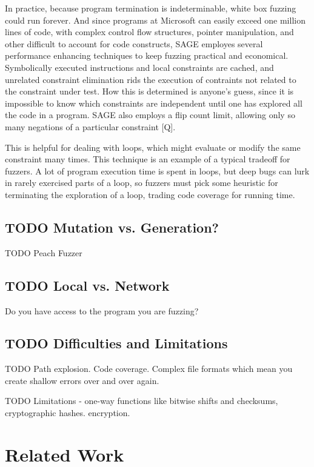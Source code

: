 \documentclass[11pt,expanded,copyright]{fsuthesis}
\begin{document}
In practice, because program termination is indeterminable, white box fuzzing could run forever. And since programs at Microsoft can easily exceed one million lines of code, with complex control flow structures, pointer manipulation, and other difficult to account for code constructs, SAGE employes several performance enhancing techniques to keep fuzzing practical and economical. Symbolically executed instructions and local constraints are cached, and unrelated constraint elimination rids the execution of contraints not related to the constraint under test. How this is determined is anyone's guess, since it is impossible to know which constraints are independent until one has explored all the code in a program. SAGE also employs a flip count limit, allowing only so many negations of a particular constraint [Q]. 

This is helpful for dealing with loops, which might evaluate or modify the same constraint many times. This technique is an example of a typical tradeoff for fuzzers. A lot of program execution time is spent in loops, but deep bugs can lurk in rarely exercised parts of a loop, so fuzzers must pick some heuristic for terminating the exploration of a loop, trading code coverage for running time.


\section{TODO Mutation vs. Generation?}

TODO Peach Fuzzer

\section{TODO Local vs. Network}

Do you have access to the program you are fuzzing?

\section{TODO Difficulties and Limitations}

TODO Path explosion. Code coverage. Complex file formats which mean you create shallow errors over and over again.

TODO Limitations - one-way functions like bitwise shifts and checksums, cryptographic hashes. encryption.


\chapter{Related Work}
\end{document}
